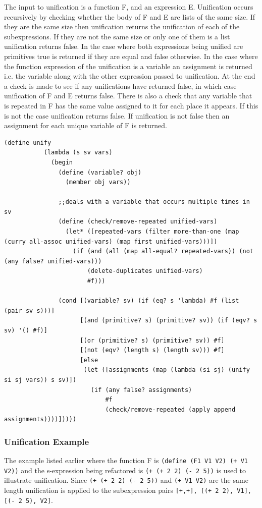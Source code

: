 \documentclass[a4paper,10pt]{article}
\begin{document}
The input to unification is a function F, and an expression E.  Unification occurs recursively by checking whether the body of F and E are lists of the same size.  If they are the same size then unification returns the unification of each of the subexpressions.  If they are not the same size or only one of them is a list unification returns false.  In the case where both expressions being unified are primitives true is returned if they are equal and false otherwise.  In the case where the function expression of the unification is a variable an assignment is returned i.e. the variable along with the other expression passed to unification.  At the end a check is made to see if any unifications have returned false, in which case unification of F and E returns false.  There is also a check that any variable that is repeated in F has the same value assigned to it for each place it appears.  If this is not the case unification returns false. If unification is not false then an assignment for each unique variable of F is returned.

\begin{lstlisting}[frame=trBL]
(define unify
           (lambda (s sv vars)
             (begin
               (define (variable? obj)
                 (member obj vars))

               ;;deals with a variable that occurs multiple times in sv
               (define (check/remove-repeated unified-vars)
                 (let* ([repeated-vars (filter more-than-one (map (curry all-assoc unified-vars) (map first unified-vars)))])
                   (if (and (all (map all-equal? repeated-vars)) (not (any false? unified-vars)))
                       (delete-duplicates unified-vars)
                       #f)))
               
               (cond [(variable? sv) (if (eq? s 'lambda) #f (list (pair sv s)))]
                     [(and (primitive? s) (primitive? sv)) (if (eqv? s sv) '() #f)]
                     [(or (primitive? s) (primitive? sv)) #f]
                     [(not (eqv? (length s) (length sv))) #f]
                     [else
                      (let ([assignments (map (lambda (si sj) (unify si sj vars)) s sv)])
                        (if (any false? assignments)
                            #f
                            (check/remove-repeated (apply append assignments))))]))))
\end{lstlisting}
\subsubsection{Unification Example}
The example listed earlier where the function F is \texttt{(define (F1 V1 V2) (+ V1 V2))} and the s-expression being refactored is \texttt{(+ (+ 2 2) (- 2 5))} is used to illustrate unification.  Since \texttt{(+ (+ 2 2) (- 2 5))} and \texttt{(+ V1 V2)} are the same length unification is applied to the subexpression pairs \texttt{[+,+], [(+ 2 2), V1], [(- 2 5), V2]}.
\end{document}
